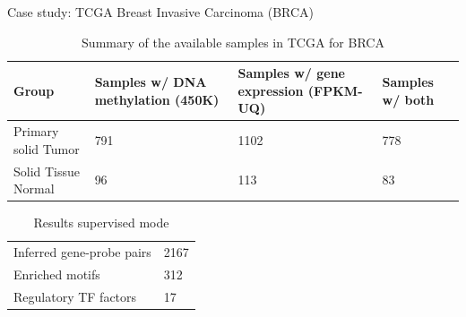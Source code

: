 \documentclass[slidestop,compress,11pt,xcolor=dvipsnames]{beamer}
\begin{document}
\begin{frame}{Case study: TCGA Breast Invasive Carcinoma (BRCA)}
 \begin{table}[ht!]
  \centering
  \caption{Summary of the available samples in TCGA for BRCA}
  \scriptsize

  \begin{tabular}{p{2.3cm}p{2.4cm}p{2.4cm}p{1cm}}
   \toprule
   Group               & Samples w/ DNA methylation (450K) & Samples w/ gene expression (FPKM-UQ) & Samples w/ both \\ \midrule
   Primary solid Tumor & 791                               & 1102                                 & 778             \\
   Solid Tissue Normal & 96                                & 113                                  & 83              \\
   \bottomrule
  \end{tabular}
 \end{table}

 \begin{table}[ht!]
  \centering
  \caption{Results supervised mode}
  \scriptsize

  \begin{tabular}{p{2.8cm}p{2.4cm}}
   \toprule
   Inferred gene-probe pairs & 2167 \\
   Enriched motifs           & 312  \\
   Regulatory TF factors     & 17   \\
   \bottomrule
  \end{tabular}
 \end{table}
\end{frame}


\end{document}
